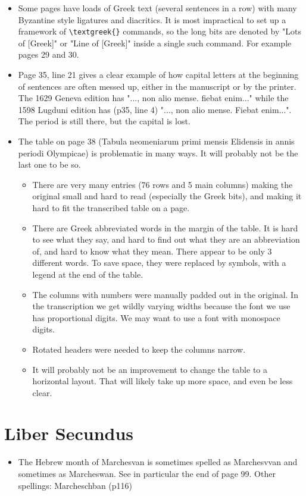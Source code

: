 \documentclass{report}
\begin{document}
\begin{itemize}
\item
Some pages have loads of Greek text (several sentences in a row) with many
Byzantine style ligatures and diacritics. It is most impractical to set up
a framework of \verb+\textgreek{}+ commands, so the long bits are denoted
by "Lots of [Greek]" or "Line of [Greek]" inside a single such command.
For example pages 29 and 30.
\item
Page 35, line 21 gives a clear example of how capital letters at the beginning
of sentences are often messed up, either in the manuscript or by the printer.
The 1629 Geneva edition has "..., non alio mense. fiebat enim..." while the
1598 Lugduni edition has (p35, line 4) "..., non alio mense. Fiebat enim...".
The period is still there, but the capital is lost.
\item
The table on page 38 (Tabula neomeniarum primi mensis Elidensis in annis
periodi Olympicae) is problematic in many ways. It will probably not be 
the last one to be so.
\begin{itemize}
  \item{}There are very many entries (76 rows and 5 main columns) making the
  original small and hard to read (especially the Greek bits), and making it
  hard to fit the transcribed table on a page.
  \item{}There are Greek abbreviated words in the margin of the table. It is
  hard to see what they say, and hard to find out what they are an abbreviation
  of, and hard to know what they mean. There appear to be only 3 different
  words. To save space, they were replaced by symbols, with a legend at the
  end of the table.
  \item{}The columns with numbers were manually padded out in the original.
  In the transcription we get wildly varying widths  because the font we use
  has proportional digits. We may want to use a font with monospace digits.
  \item{}Rotated headers were needed to keep the columns narrow.
  \item{}It will probably not be an improvement to change the table to a
  horizontal layout. That will likely take up more space, and even be
  less clear.
\end{itemize}
\end{itemize}

\section{Liber Secundus}
\begin{itemize}
\item
The Hebrew month of Marchesvan is sometimes spelled as Marchesvvan and
sometimes as Marcheswan. See in particular the end of page 99.
Other spellings: Marcheschban (p116)
\end{itemize}
\end{document}
